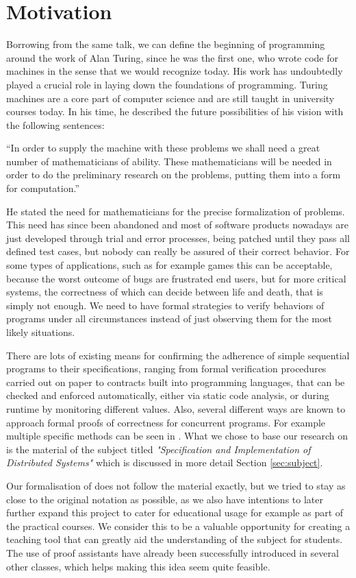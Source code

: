 \section{Motivation}

Borrowing from the same talk, we can define the beginning of programming around the work of Alan Turing, since he was the first one, who wrote code for machines in the sense that we would recognize today. His work has undoubtedly played a crucial role in laying down the foundations of programming. Turing machines are a core part of computer science and are still taught in university courses today. In his time, he described the future possibilities of his vision with the following sentences:

``In order to supply the machine with these problems we shall need a great number of mathematicians of ability. These mathematicians will be needed in order to do the preliminary research on the problems, putting them into a form for computation.''

He stated the need for mathematicians for the precise formalization of problems. This need has since been abandoned and most of software products nowadays are just developed through trial and error processes, being patched until they pass all defined test cases, but nobody can really be assured of their correct behavior. For some types of applications, such as for example games this can be acceptable, because the worst outcome of bugs are frustrated end users, but for more critical systems, the correctness of which can decide between life and death, that is simply not enough. We need to have formal strategies to verify behaviors of programs under all circumstances instead of just observing them for the most likely situations.

There are lots of existing means for confirming the adherence of simple sequential programs to their specifications, ranging from formal verification procedures carried out on paper to contracts built into programming languages, that can be checked and enforced automatically, either via static code analysis, or during runtime by monitoring different values. Also, several different ways are known to approach formal proofs of correctness for concurrent programs. For example multiple specific methods can be seen in \cite{hons_1202}. What we chose to base our research on is the material of the subject titled \textit{"Specification and Implementation of Distributed Systems"} which is discussed in more detail Section \ref{sec:subject}.

Our formalisation of does not follow the material exactly, but we tried to stay as close to the original notation as possible, as we also have intentions to later further expand this project to cater for educational usage for example as part of the practical courses. We consider this to be a valuable opportunity for creating a teaching tool that can greatly aid the understanding of the subject for students. The use of proof assistants have already been successfully introduced in several other classes\cite{formalsemantics-typesystems}, which helps making this idea seem quite feasible.
